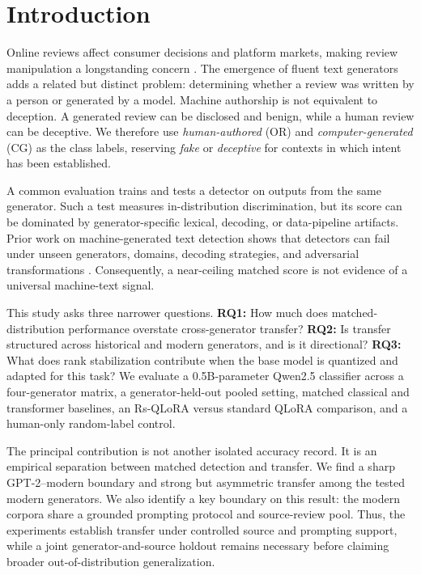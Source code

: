 \documentclass[utf8]{FrontiersinHarvard}
\begin{document}
\section{Introduction}

Online reviews affect consumer decisions and platform markets, making review manipulation a longstanding concern \citep{Jindal2008,Ott2011}. The emergence of fluent text generators adds a related but distinct problem: determining whether a review was written by a person or generated by a model. Machine authorship is not equivalent to deception. A generated review can be disclosed and benign, while a human review can be deceptive. We therefore use \emph{human-authored} (OR) and \emph{computer-generated} (CG) as the class labels, reserving \emph{fake} or \emph{deceptive} for contexts in which intent has been established.

A common evaluation trains and tests a detector on outputs from the same generator. Such a test measures in-distribution discrimination, but its score can be dominated by generator-specific lexical, decoding, or data-pipeline artifacts. Prior work on machine-generated text detection shows that detectors can fail under unseen generators, domains, decoding strategies, and adversarial transformations \citep{Pu2023,Dugan2024}. Consequently, a near-ceiling matched score is not evidence of a universal machine-text signal.

This study asks three narrower questions. \textbf{RQ1:} How much does matched-distribution performance overstate cross-generator transfer? \textbf{RQ2:} Is transfer structured across historical and modern generators, and is it directional? \textbf{RQ3:} What does rank stabilization contribute when the base model is quantized and adapted for this task? We evaluate a 0.5B-parameter Qwen2.5 classifier across a four-generator matrix, a generator-held-out pooled setting, matched classical and transformer baselines, an Rs-QLoRA versus standard QLoRA comparison, and a human-only random-label control.

The principal contribution is not another isolated accuracy record. It is an empirical separation between matched detection and transfer. We find a sharp GPT-2--modern boundary and strong but asymmetric transfer among the tested modern generators. We also identify a key boundary on this result: the modern corpora share a grounded prompting protocol and source-review pool. Thus, the experiments establish transfer under controlled source and prompting support, while a joint generator-and-source holdout remains necessary before claiming broader out-of-distribution generalization.
\end{document}
